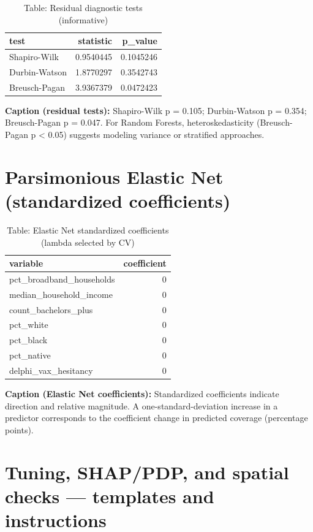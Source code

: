 \documentclass[
  11pt,
]{article}
\begin{document}
\begin{longtable}[t]{lrr}
\caption{\label{tab:residual-tests-visible}Table: Residual diagnostic tests (informative)}\\
\toprule
test & statistic & p\_value\\
\midrule
Shapiro-Wilk & 0.9540445 & 0.1045246\\
Durbin-Watson & 1.8770297 & 0.3542743\\
Breusch-Pagan & 3.9367379 & 0.0472423\\
\bottomrule
\end{longtable}

\textbf{Caption (residual tests):} Shapiro-Wilk p = 0.105; Durbin-Watson
p = 0.354; Breusch-Pagan p = 0.047. For Random Forests,
heteroskedasticity (Breusch-Pagan p \textless{} 0.05) suggests modeling
variance or stratified approaches.

\newpage

\section{Parsimonious Elastic Net (standardized
coefficients)}\label{parsimonious-elastic-net-standardized-coefficients}

\begin{longtable}[t]{lr}
\caption{\label{tab:elastic-net-visible}Table: Elastic Net standardized coefficients (lambda selected by CV)}\\
\toprule
variable & coefficient\\
\midrule
pct\_broadband\_households & 0\\
median\_household\_income & 0\\
count\_bachelors\_plus & 0\\
pct\_white & 0\\
pct\_black & 0\\
\addlinespace
pct\_native & 0\\
delphi\_vax\_hesitancy & 0\\
\bottomrule
\end{longtable}

\textbf{Caption (Elastic Net coefficients):} Standardized coefficients
indicate direction and relative magnitude. A one-standard-deviation
increase in a predictor corresponds to the coefficient change in
predicted coverage (percentage points).

\newpage

\section{Tuning, SHAP/PDP, and spatial checks --- templates and
instructions}\label{tuning-shappdp-and-spatial-checks-templates-and-instructions}
\end{document}
